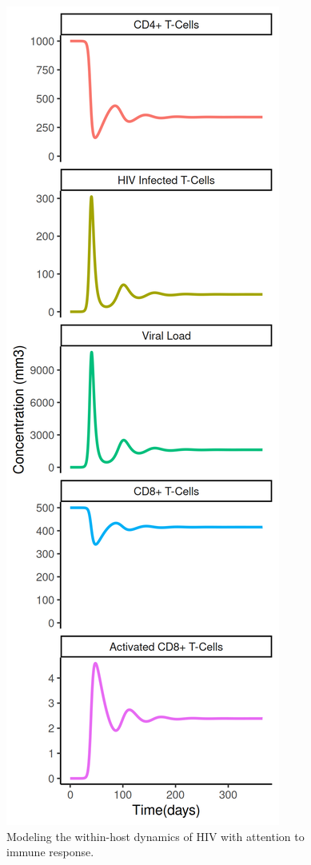 \documentclass[letterpaper, 11 pt, conference]{ieeeconf}
\begin{document}
\begin{figure}[thpb]       
      \centering
      \includegraphics[scale = .5]{Images/result_ocm_1col.png}
      \caption{Modeling the within-host dynamics of HIV with attention to immune response.}
      \label{fig : 3}
\end{figure}
\end{document}
